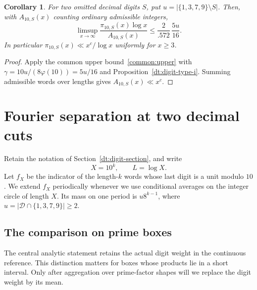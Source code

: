 \documentclass[11pt,a4paper]{article}
\theoremstyle{paperplain}
\newtheorem{corollary}[theorem]{Corollary}
\numberwithin{equation}{section}
\begin{document}
\begin{corollary}\label{dt:digit-prime-upper}
For two omitted decimal digits $S$, put $u=|\{1,3,7,9\}\setminus S|$.
Then, with $A_{10,S}(x)$ counting ordinary admissible integers,
\[
 \limsup_{x\to\infty}\frac{\pi_{10,S}(x)\log x}{A_{10,S}(x)}
 \le \frac{2}{.572}\,\frac{5u}{16}.
\]
In particular $\pi_{10,S}(x)\ll x^c/\log x$ uniformly for $x\ge3$.
\end{corollary}
\begin{proof}
Apply the common upper bound~\ref{common:upper} with
$\gamma=10u/(8\varphi(10))=5u/16$ and Proposition~\ref{dt:digit-type-i}.
Summing admissible words over lengths gives $A_{10,S}(x)\ll x^c$.
\end{proof}

\section{Fourier separation at two decimal cuts}\label{dt:section}

Retain the notation of Section~\ref{dt:digit-section}, and write
\[
 X=10^k,\qquad L=\log X.
\]
Let \(f_X\) be the indicator
of the length-\(k\) words whose last digit is a unit modulo \(10\).
We extend \(f_X\) periodically whenever we use conditional averages
on the integer circle of length \(X\). Its mass on one period is
\(u8^{k-1}\), where \(u=|\mathcal D\cap\{1,3,7,9\}|\ge2\).

\subsection{The comparison on prime boxes}\label{dt:comparison-setup}

The central analytic statement retains the actual digit weight in the
continuous reference. This distinction matters for boxes whose products
lie in a short interval. Only after aggregation over prime-factor shapes
will we replace the digit weight by its mean.
\end{document}
